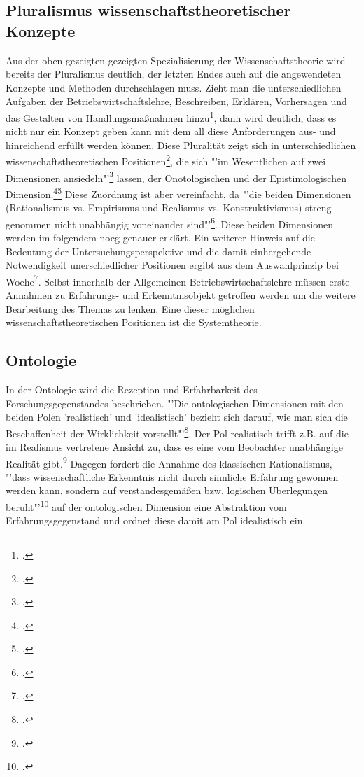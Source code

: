 \documentclass[a4paper,12pt]{article}
\begin{document}
\subsection{Pluralismus wissenschaftstheoretischer Konzepte}
Aus der oben gezeigten gezeigten Spezialisierung der Wissenschaftstheorie wird bereits der Pluralismus deutlich, der letzten Endes auch auf die angewendeten Konzepte und Methoden durchschlagen muss. Zieht man die unterschiedlichen Aufgaben der Betriebswirtschaftslehre, Beschreiben, Erklären, Vorhersagen und das Gestalten von Handlungsmaßnahmen hinzu\footcite[S. 25]{Helfrich2024}, dann wird deutlich, dass es nicht nur ein Konzept geben kann mit dem all diese Anforderungen aus- und hinreichend erfüllt werden können. Diese Pluralität zeigt sich in unterschiedlichen wissenschaftstheoretischen Positionen\footcite[S. 93]{Helfrich2024}, die sich "'im Wesentlichen auf zwei Dimensionen ansiedeln"'\footcite[S. 94]{Helfrich2024} lassen, der Onotologischen und der Epistimologischen Dimension.\footcite[S. 94]{Helfrich2024}\footcite[S. 29]{Kornmeier2007} Diese Zuordnung ist aber vereinfacht, da "'die beiden Dimensionen (Rationalismus vs. Empirismus und Realismus vs. Konstruktivismus) streng genommen nicht unabhängig voneinander sind"'\footcite[S. 29]{Kornmeier2007}. Diese beiden Dimensionen werden im folgendem nocg genauer erklärt.
Ein weiterer Hinweis auf die Bedeutung der Untersuchungsperspektive und die damit einhergehende Notwendigkeit unerschiedlicher Positionen ergibt aus dem Auswahlprinzip bei Woehe\footcite[S. 38]{Woehe2008}. Selbst innerhalb der Allgemeinen Betriebswirtschaftslehre müssen erste Annahmen zu Erfahrungs- und Erkenntnisobjekt getroffen werden um die weitere Bearbeitung des Themas zu lenken. Eine dieser möglichen wissenschaftstheoretischen Positionen ist die Systemtheorie.

\subsection{Ontologie}
In der Ontologie wird die Rezeption und Erfahrbarkeit des Forschungsgegenstandes beschrieben. "'Die ontologischen Dimensionen mit den beiden Polen 'realistisch' und 'idealistisch' bezieht sich darauf, wie man sich die Beschaffenheit  der Wirklichkeit vorstellt"'\footcite[S. 94]{Helfrich2024}. Der Pol realistisch trifft z.B. auf die im Realismus vertretene Ansicht zu, dass es eine vom Beobachter unabhängige Realität gibt.\footcite[S. 95]{Helfrich2024} Dagegen fordert die Annahme des klassischen Rationalismus, "'dass wissenschaftliche Erkenntnis nicht durch sinnliche Erfahrung gewonnen werden kann, sondern auf verstandesgemäßen bzw. logischen Überlegungen beruht"'\footcite[S. 100]{Helfrich2024} auf der ontologischen Dimension eine Abstraktion vom Erfahrungsgegenstand und ordnet diese damit am Pol idealistisch ein.
\end{document}

